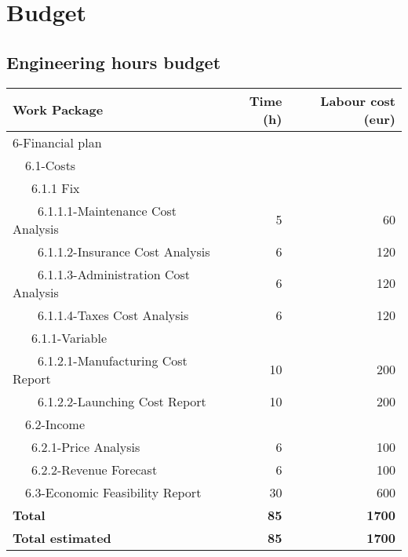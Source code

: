 \documentclass[12pt, titlepage]{article}
\begin{document}
\section{Budget}


\subsection{Engineering hours budget}
\begin{tabular}{ | l | r | r | }
\hline
Work Package & Time (h) & Labour cost (eur) \\ \hline
6-Financial plan &  &  \\ \hline
~~6.1-Costs &  &  \\ \hline
~~~6.1.1 Fix & & \\ \hline
~~~~6.1.1.1-Maintenance Cost Analysis & 5 & 60  \\ \hline
~~~~6.1.1.2-Insurance Cost Analysis & 6 & 120 \\ \hline
~~~~6.1.1.3-Administration Cost Analysis & 6 & 120 \\ \hline
~~~~6.1.1.4-Taxes Cost Analysis  & 6 & 120 \\ \hline
~~~6.1.1-Variable & & \\ \hline
~~~~6.1.2.1-Manufacturing Cost Report & 10 & 200 \\ \hline
~~~~6.1.2.2-Launching Cost Report & 10 & 200 \\ \hline
~~6.2-Income &  &  \\ \hline
~~~6.2.1-Price Analysis & 6 & 100 \\ \hline
~~~6.2.2-Revenue Forecast & 6 & 100 \\ \hline
~~6.3-Economic Feasibility Report& 30 & 600  \\ \hline
\textbf{Total} & \textbf{85} & \textbf{1700} \\ \hline
\textbf{Total estimated} & \textbf{85} & \textbf{1700} \\
\hline
\end{tabular}
 
\end{document}
